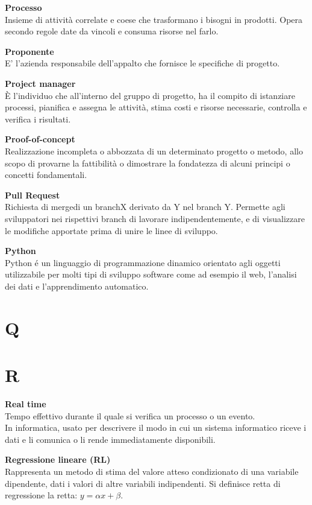 \documentclass[a4paper, oneside, openany, dvipsnames, table, 12pt]{article}
\begin{document}
\textbf{Processo} \\
Insieme di attività correlate e coese che trasformano i bisogni in prodotti. Opera secondo regole date da vincoli e consuma risorse nel farlo.

\textbf{Proponente} \\
E' l'azienda responsabile dell'appalto che fornisce le specifiche di progetto.

\textbf{Project manager} \\
È l'individuo che all'interno del gruppo di progetto, ha il compito di istanziare processi, pianifica e assegna le attività, stima costi e risorse necessarie, controlla e verifica i risultati.

\textbf{Proof-of-concept} \\
Realizzazione incompleta o abbozzata di un determinato progetto o metodo, allo scopo di provarne la fattibilità o dimostrare la fondatezza di alcuni principi o concetti fondamentali.

\textbf{Pull Request} \\
Richiesta di merge\glo di un branch\glo X derivato da Y nel branch Y. Permette agli sviluppatori nei rispettivi branch di lavorare indipendentemente, e di visualizzare le modifiche apportate prima di unire le linee di sviluppo.

\textbf{Python} \\
Python \'e un linguaggio di programmazione dinamico orientato agli oggetti utilizzabile per molti tipi di sviluppo software come ad esempio il web, l'analisi dei dati e l'apprendimento automatico.

\newpage
\section{Q}

\newpage
\section{R}
\textbf{Real time} \\
Tempo effettivo durante il quale si verifica un processo o un evento. \\
In informatica, usato per descrivere il modo in cui un sistema informatico riceve i dati e li comunica o li rende immediatamente disponibili.

\textbf{Regressione lineare (RL)} \\
Rappresenta un metodo di stima del valore atteso condizionato di una variabile dipendente, dati i valori di altre variabili indipendenti. Si definisce retta di regressione la retta: $y = \alpha x + \beta $.
\end{document}

